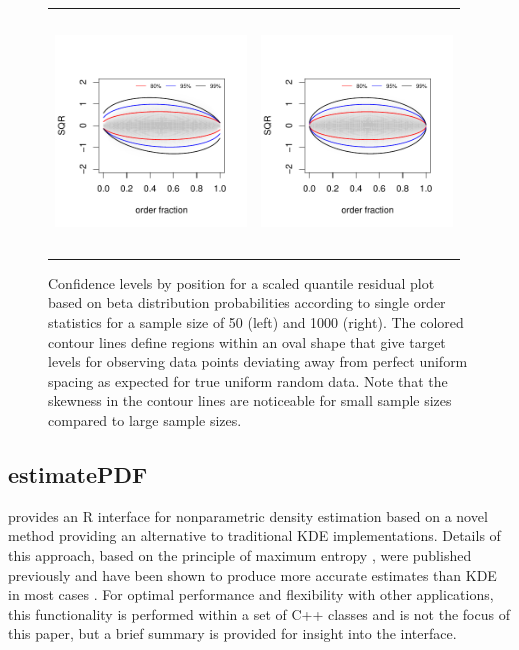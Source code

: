 \begin{figure}[!htb]
\centering
\begin{tabular}{p{} p{}}
  \vspace{0pt} \includegraphics[width=2.0in, height=2.5in]{Figure2a.pdf} &
  \vspace{0pt} \includegraphics[width=2.0in, height=2.5in]{Figure2b.pdf} 
\end{tabular}
\caption{\label{fig:sqr} Confidence levels by position for a scaled quantile residual plot based on beta distribution probabilities according to single order 
statistics for a sample size of 50 (left) and 1000 (right). The colored contour lines define regions within an oval shape that give target levels for observing data points deviating away from perfect uniform spacing as expected for true uniform random data. Note that the skewness in the contour lines are noticeable for small sample sizes compared to large sample sizes.}
\end{figure}
\subsection{estimatePDF} \label{estimatePDF}

 provides an R interface for nonparametric density estimation based on a novel method providing an alternative to traditional KDE implementations. Details of this approach, based on the principle of maximum entropy \citep{mem1}, were published previously and have been shown to produce more accurate estimates than KDE in most cases \citep{PDFe1, PDFe2, kdeR6, matlab}. For optimal performance and flexibility with other applications, this functionality is performed within a set of C++ classes and is not the focus of this paper, but a brief summary is provided for insight into the  interface.


